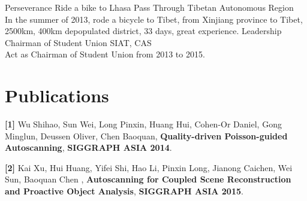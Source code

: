 \documentclass[]{friggeri-cv}
\begin{document}
\begin{entrylist}
    \entry
    {Perseverance}
    {Ride a bike to Lhasa}
    {Pass Through Tibetan Autonomous Region}
    {\\In the summer of 2013, rode a bicycle to Tibet, from Xinjiang province to Tibet, 2500km, 400km depopulated district, 33 days, great experience.}
    \entry
    {Leadership}
    {Chairman of Student Union}
    {SIAT, CAS}
    {\\Act as Chairman of Student Union from 2013  to 2015.}
\end{entrylist}

\section{Publications}

\textbf{[1]} Wu Shihao, Sun Wei, Long Pinxin, Huang Hui, Cohen-Or Daniel, Gong Minglun, Deussen Oliver, Chen Baoquan, \textbf{Quality-driven Poisson-guided Autoscanning}, \textbf{SIGGRAPH ASIA 2014}.
		
\textbf{[2]} Kai Xu, Hui Huang, Yifei Shi, Hao Li, Pinxin Long, Jianong Caichen, Wei Sun, Baoquan Chen , \textbf{Autoscanning for Coupled Scene Reconstruction and Proactive Object Analysis}, \textbf{SIGGRAPH ASIA 2015}.

% 
\end{document}
